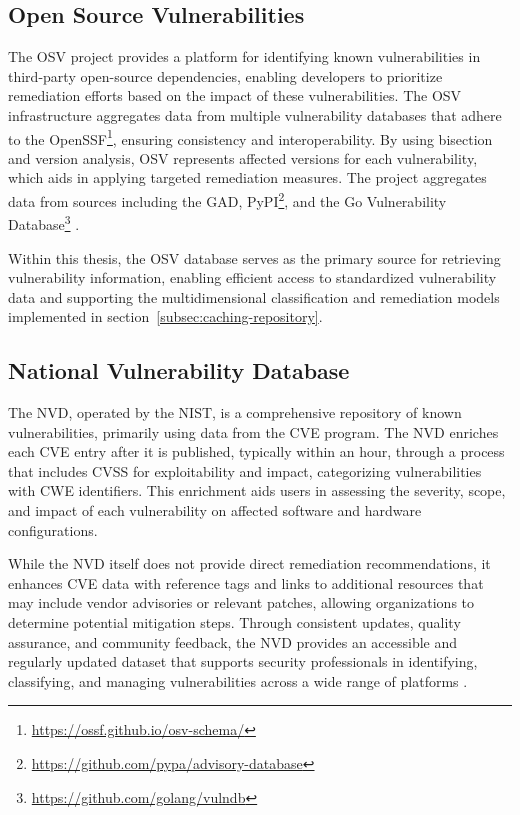 \subsection{Open Source Vulnerabilities}
\label{subsec:open-source-vulnerabilities}

The \ac{OSV} project provides a platform for identifying known vulnerabilities in third-party open-source dependencies, enabling developers to prioritize remediation efforts based on the impact of these vulnerabilities. The \ac{OSV} infrastructure aggregates data from multiple vulnerability databases that adhere to the \ac{OpenSSF}\footnote{\url{https://ossf.github.io/osv-schema/}}, ensuring consistency and interoperability. By using bisection and version analysis, \ac{OSV} represents affected versions for each vulnerability, which aids in applying targeted remediation measures. The project aggregates data from sources including the \ac{GAD}, PyPI\footnote{\url{https://github.com/pypa/advisory-database}}, and the Go Vulnerability Database\footnote{\url{https://github.com/golang/vulndb}} \autocite{osv_introduction_2024}.

Within this thesis, the \ac{OSV} database serves as the primary source for retrieving vulnerability information, enabling efficient access to standardized vulnerability data and supporting the multidimensional classification and remediation models implemented in section~\ref{subsec:caching-repository}.

\subsection{National Vulnerability Database}
\label{subsec:national-vulnerability-database}

The \ac{NVD}, operated by the  \ac{NIST}, is a comprehensive repository of known vulnerabilities, primarily using data from the \ac{CVE} program. The \ac{NVD} enriches each \ac{CVE} entry after it is published, typically within an hour, through a process that includes \ac{CVSS} for exploitability and impact, categorizing vulnerabilities with \ac{CWE} identifiers. This enrichment aids users in assessing the severity, scope, and impact of each vulnerability on affected software and hardware configurations.

While the \ac{NVD} itself does not provide direct remediation recommendations, it enhances \ac{CVE} data with reference tags and links to additional resources that may include vendor advisories or relevant patches, allowing organizations to determine potential mitigation steps. Through consistent updates, quality assurance, and community feedback, the \ac{NVD} provides an accessible and regularly updated dataset that supports security professionals in identifying, classifying, and managing vulnerabilities across a wide range of platforms \autocite{nist_nvd_2024}.

